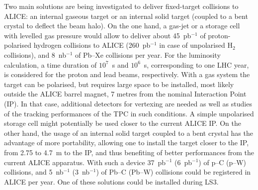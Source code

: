 \documentclass[../report.tex]{subfiles}
\begin{document}
Two main solutions are being investigated to deliver fixed-target collisions to ALICE: an internal gaseous target or an internal solid target (coupled to a bent crystal to deflect the beam halo). On the one hand, a gas-jet or a storage cell with levelled gas pressure would allow to deliver about 45~pb$^{-1}$ of proton-polarised hydrogen collisions to ALICE (260~pb$^{-1}$  in case of unpolarised H$_{2}$ collisions), and 8~nb$^{-1}$ of Pb--Xe collisions per year. For the luminosity calculation, a time duration of $10^7$~s and $10^6$~s, corresponding to one LHC year, is considered for the proton and lead beams, respectively. With a gas system the target can be polarised, but requires large space to be installed, most likely outside the ALICE barrel magnet, 7 metres from the nominal Interaction Point (IP). In that case, additional detectors for vertexing are needed as well as studies of the tracking performances of the TPC in such conditions. A simple unpolarised storage cell might potentially be used closer to the current ALICE IP. On the other hand, the usage of an internal solid target coupled to a bent crystal has the advantage of more portability, allowing one to install the target closer to the IP, from 2.75 to 4.7~m to the IP, and thus benefiting of better performances from the current ALICE apparatus. With such a device 37~pb$^{-1}$ (6~pb$^{-1}$) of p--C (p--W) collisions, and 5~nb$^{-1}$ (3~nb$^{-1}$) of Pb--C (Pb--W) collisions could be registered in ALICE per year. One of these solutions could be
installed during LS3. 
\end{document}

